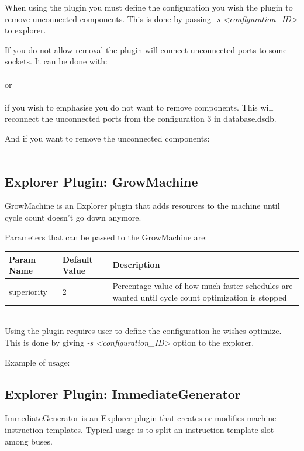 \documentclass[a4paper,twoside]{tceusermanual}
\begin{document}
When using the plugin you must define the configuration you wish the plugin
to remove unconnected components. This is done by passing 
\textit{-s <configuration\_ID>} to explorer.

If you do not allow removal the plugin will connect unconnected ports to some
sockets. It can be done with: \\
\\
or \\
\\
if you wish to emphasise you do not want to remove components. This will
reconnect the unconnected ports from the configuration 3 in database.dsdb.

And if you want to remove the unconnected components: \\
\\

\subsection{Explorer Plugin: GrowMachine}
GrowMachine is an Explorer plugin that adds resources to the machine until
cycle count doesn't go down anymore.

Parameters that can be passed to the GrowMachine are:

\begin{tabular}{p{}p{}
                p{}}
\textbf{Param Name} &\textbf{Default Value} &\textbf{Description} \\
\hline
superiority & 2 & Percentage value of how much faster schedules are wanted
    until cycle count optimization is stopped \\
\end{tabular}\\

Using the plugin requires user to define the configuration he wishes optimize.
This is done by giving \textit{-s <configuration\_ID>} option to the explorer.

Example of usage:


\subsection{Explorer Plugin: ImmediateGenerator}
ImmediateGenerator is an Explorer plugin that creates or modifies machine
instruction templates. Typical usage is to split an instruction template slot
among buses.
\end{document}
